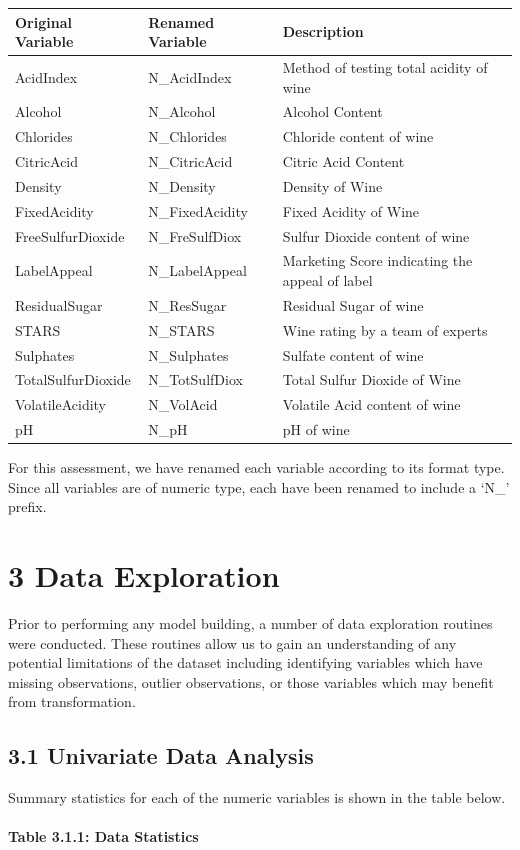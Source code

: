 \documentclass[]{article}
\let\oldparagraph\paragraph
\renewcommand{\paragraph}[1]{\oldparagraph{#1}\mbox{}}
\begin{document}
\begin{longtable}[]{@{}lll@{}}
\toprule
Original Variable & Renamed Variable & Description\tabularnewline
\midrule
\endhead
AcidIndex & N\_AcidIndex & Method of testing total acidity of
wine\tabularnewline
Alcohol & N\_Alcohol & Alcohol Content\tabularnewline
Chlorides & N\_Chlorides & Chloride content of wine\tabularnewline
CitricAcid & N\_CitricAcid & Citric Acid Content\tabularnewline
Density & N\_Density & Density of Wine\tabularnewline
FixedAcidity & N\_FixedAcidity & Fixed Acidity of Wine\tabularnewline
FreeSulfurDioxide & N\_FreSulfDiox & Sulfur Dioxide content of
wine\tabularnewline
LabelAppeal & N\_LabelAppeal & Marketing Score indicating the appeal of
label\tabularnewline
ResidualSugar & N\_ResSugar & Residual Sugar of wine\tabularnewline
STARS & N\_STARS & Wine rating by a team of experts\tabularnewline
Sulphates & N\_Sulphates & Sulfate content of wine\tabularnewline
TotalSulfurDioxide & N\_TotSulfDiox & Total Sulfur Dioxide of
Wine\tabularnewline
VolatileAcidity & N\_VolAcid & Volatile Acid content of
wine\tabularnewline
pH & N\_pH & pH of wine\tabularnewline
\bottomrule
\end{longtable}

For this assessment, we have renamed each variable according to its
format type. Since all variables are of numeric type, each have been
renamed to include a `N\_' prefix.

\section{3 Data Exploration}\label{data-exploration}

Prior to performing any model building, a number of data exploration
routines were conducted. These routines allow us to gain an
understanding of any potential limitations of the dataset including
identifying variables which have missing observations, outlier
observations, or those variables which may benefit from transformation.

\subsection{3.1 Univariate Data
Analysis}\label{univariate-data-analysis}

Summary statistics for each of the numeric variables is shown in the
table below.

\paragraph{Table 3.1.1: Data
Statistics}\label{table-3.1.1-data-statistics}
\end{document}
